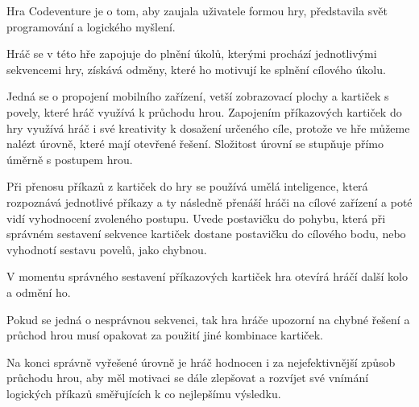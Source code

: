 Hra Codeventure je o tom, aby zaujala uživatele formou hry, představila svět programování a logického myšlení.\par
Hráč se v této hře zapojuje do plnění úkolů, kterými prochází jednotlivými sekvencemi hry, získává odměny, které ho motivují ke splnění cílového úkolu.\par Jedná se o propojení mobilního zařízení, vetší zobrazovací plochy a kartiček s povely, které hráč využívá k průchodu hrou. Zapojením příkazových kartiček do hry využívá hráč i své kreativity k dosažení určeného cíle, protože ve hře můžeme nalézt úrovně, které mají otevřené řešení. Složitost úrovní se stupňuje přímo úměrně s postupem hrou.\par Při přenosu příkazů z kartiček do hry se používá umělá inteligence, která rozpoznává jednotlivé příkazy a ty následně přenáší hráči na cílové zařízení a poté vidí vyhodnocení zvoleného postupu. Uvede postavičku do pohybu, která při správném sestavení sekvence kartiček dostane postavičku do cílového bodu, nebo vyhodnotí sestavu povelů, jako chybnou.\par
V momentu správného sestavení příkazových kartiček hra otevírá hráčí další kolo a odmění ho.\par Pokud se jedná o nesprávnou sekvenci, tak hra hráče upozorní na chybné řešení a průchod hrou musí opakovat za použití jiné kombinace kartiček.\par Na konci správně vyřešené úrovně je hráč hodnocen i za nejefektivnější způsob průchodu hrou, aby měl motivaci se dále zlepšovat a rozvíjet své vnímání logických příkazů směřujících k co nejlepšímu výsledku.